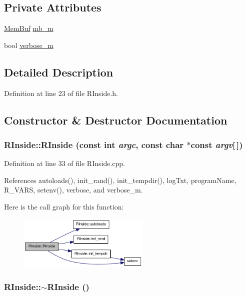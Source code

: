 \subsection*{Private Attributes}
\begin{DoxyCompactItemize}
\item 
\hyperlink{classMemBuf}{MemBuf} \hyperlink{classRInside_ad078e52002a242f7f5c94211ca3dd8be}{mb\_\-m}
\item 
bool \hyperlink{classRInside_a186dad3e463fedc586f3d02784a814b2}{verbose\_\-m}
\end{DoxyCompactItemize}


\subsection{Detailed Description}


Definition at line 23 of file RInside.h.

\subsection{Constructor \& Destructor Documentation}
\hypertarget{classRInside_aeecbfd63737539d1731b2f38852b3751}{
\subsubsection[{RInside}]{\setlength{\rightskip}{0pt plus 5cm}RInside::RInside (const int {\em argc}, \/  const char $\ast$const  {\em argv}\mbox{[}$\,$\mbox{]})}}
\label{classRInside_aeecbfd63737539d1731b2f38852b3751}


Definition at line 33 of file RInside.cpp.

References autoloads(), init\_\-rand(), init\_\-tempdir(), logTxt, programName, R\_\-VARS, setenv(), verbose, and verbose\_\-m.

Here is the call graph for this function:\nopagebreak
\begin{figure}[H]
\begin{center}
\leavevmode
\includegraphics[width=178pt]{classRInside_aeecbfd63737539d1731b2f38852b3751_cgraph}
\end{center}
\end{figure}
\hypertarget{classRInside_a277fc333d12163eaea9b903711586146}{
\subsubsection[{$\sim$RInside}]{\setlength{\rightskip}{0pt plus 5cm}RInside::$\sim$RInside ()}}
\label{classRInside_a277fc333d12163eaea9b903711586146}


